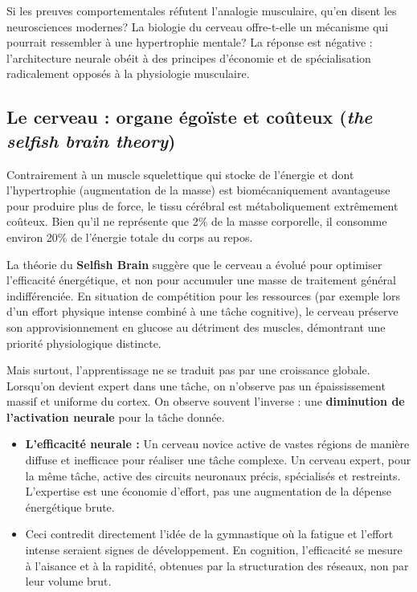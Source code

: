 Si les preuves comportementales réfutent l'analogie musculaire, qu'en disent les neurosciences
modernes? La biologie du cerveau offre-t-elle un mécanisme qui pourrait ressembler à une \og
hypertrophie\fg{} mentale? La réponse est négative : l'architecture neurale obéit à des principes
d'économie et de spécialisation radicalement opposés à la physiologie musculaire.



\subsection{Le cerveau : organe égoïste et coûteux (\textit{the selfish brain theory})}

Contrairement à un muscle squelettique qui stocke de l'énergie et dont l'hypertrophie (augmentation
de la masse) est biomécaniquement avantageuse pour produire plus de force, le tissu cérébral est
métaboliquement extrêmement coûteux. Bien qu'il ne représente que 2\% de la masse corporelle, il
consomme environ 20\% de l'énergie totale du corps au repos.

La théorie du \textbf{\og Selfish Brain\fg{}} suggère que le cerveau a évolué pour optimiser
l'efficacité énergétique, et non pour accumuler une \og masse\fg{} de traitement général
indifférenciée.\cite{II-1-1-ref6} En situation de compétition pour les ressources (par exemple lors
d'un effort physique intense combiné à une tâche cognitive), le cerveau préserve son
approvisionnement en glucose au détriment des muscles, démontrant une priorité physiologique
distincte.

Mais surtout, l'apprentissage ne se traduit pas par une \og croissance\fg{} globale. Lorsqu'on
devient expert dans une tâche, on n'observe pas un épaississement massif et uniforme du cortex. On
observe souvent l'inverse : une \textbf{diminution de l'activation neurale} pour la tâche donnée.

\begin{itemize}\item \textbf{L'efficacité neurale :} Un cerveau novice active de vastes régions de manière diffuse et inefficace pour réaliser une tâche complexe. Un cerveau expert, pour la même tâche, active des circuits neuronaux précis, spécialisés et restreints. L'expertise est une économie d'effort, pas une augmentation de la dépense énergétique brute.\cite{II-1-1-ref6}\item Ceci contredit directement l'idée de la \og gymnastique\fg{} où la fatigue et l'effort intense seraient signes de développement. En cognition, l'efficacité se mesure à l'aisance et à la rapidité, obtenues par la structuration des réseaux, non par leur volume brut.\end{itemize}

